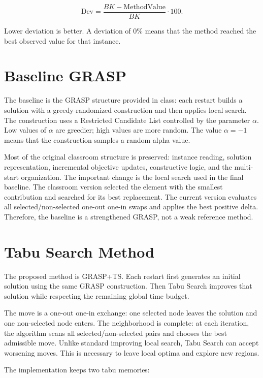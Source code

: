 \documentclass[12pt,a4paper]{article}
\newcommand{\grasp}{GRASP}
\newcommand{\graspTS}{GRASP+TS}
\newcommand{\tabu}{Tabu Search}
\begin{document}
\begin{equation}
\mathrm{Dev} = \frac{BK - \mathrm{MethodValue}}{BK}\cdot 100.
\end{equation}

Lower deviation is better. A deviation of \(0\%\) means that the method reached the best observed value for that instance.

\section{Baseline GRASP}

The baseline is the \grasp{} structure provided in class: each restart builds a solution with a greedy-randomized construction and then applies local search. The construction uses a Restricted Candidate List controlled by the parameter \(\alpha\). Low values of \(\alpha\) are greedier; high values are more random. The value \(\alpha=-1\) means that the construction samples a random alpha value.

Most of the original classroom structure is preserved: instance reading, solution representation, incremental objective updates, constructive logic, and the multi-start organization. The important change is the local search used in the final baseline. The classroom version selected the element with the smallest contribution and searched for its best replacement. The current version evaluates all selected/non-selected one-out one-in swaps and applies the best positive delta. Therefore, the baseline is a strengthened \grasp{}, not a weak reference method.

\section{Tabu Search Method}

The proposed method is \graspTS{}. Each restart first generates an initial solution using the same \grasp{} construction. Then \tabu{} improves that solution while respecting the remaining global time budget.

The move is a one-out one-in exchange: one selected node leaves the solution and one non-selected node enters. The neighborhood is complete: at each iteration, the algorithm scans all selected/non-selected pairs and chooses the best admissible move. Unlike standard improving local search, \tabu{} can accept worsening moves. This is necessary to leave local optima and explore new regions.

The implementation keeps two tabu memories:
\end{document}
